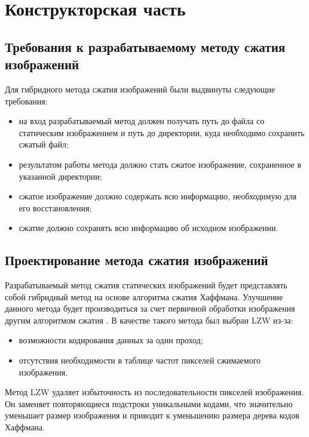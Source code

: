\chapter{Конструкторская часть}

\section{Требования к разрабатываемому методу сжатия изображений}

Для гибридного метода сжатия изображений были выдвинуты следующие требования:
\begin{itemize}
    \item на вход разрабатываемый метод должен получать путь до файла со статическим изображением и путь до директории, куда необходимо сохранить сжатый файл;
    \item результатом работы метода должно стать сжатое изображение, сохраненное в указанной директории;
    \item сжатое изображение должно содержать всю информацию, необходимую для его восстановления;
    \item сжатие должно сохранять всю информацию об исходном изображении.
\end{itemize}

\section{Проектирование метода сжатия изображений}

Разрабатываемый метод сжатия статических изображений будет представлять собой гибридный метод на основе алгоритма сжатия Хаффмана. Улучшение данного метода будет производиться за счет первичной обработки изображения другим алгоритмом сжатия \cite{my-article}. В качестве такого метода был выбран LZW из-за:
\begin{itemize}
    \item возможности кодирования данных за один проход;
    \item отсутствия необходимости в таблице частот пикселей сжимаемого изображения.
\end{itemize}

Метод LZW удаляет избыточность из последовательности пикселей изображения. Он заменяет повторяющиеся подстроки уникальными кодами, что значительно уменьшает размер изображения и приводит к уменьшению размера дерева кодов Хаффмана. 

